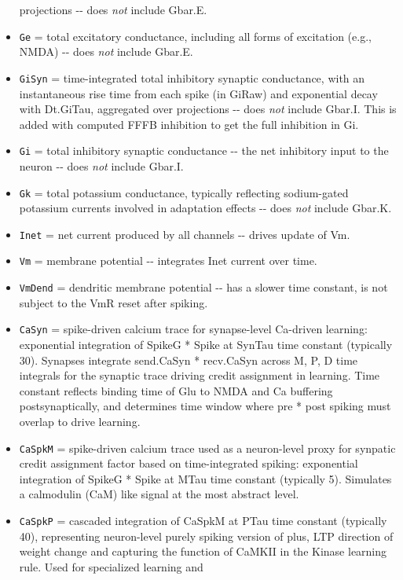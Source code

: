 \documentclass[11pt,twoside]{article}
\newif\myifpdf
\begin{document}
\begin{itemize}
  projections -\/- does \emph{not} include Gbar.E.
\item
  \texttt{Ge} = total excitatory conductance, including all forms of
  excitation (e.g., NMDA) -\/- does \emph{not} include Gbar.E.
\item
  \texttt{GiSyn} = time-integrated total inhibitory synaptic
  conductance, with an instantaneous rise time from each spike (in
  GiRaw) and exponential decay with Dt.GiTau, aggregated over
  projections -\/- does \emph{not} include Gbar.I. This is added with
  computed FFFB inhibition to get the full inhibition in Gi.
\item
  \texttt{Gi} = total inhibitory synaptic conductance -\/- the net
  inhibitory input to the neuron -\/- does \emph{not} include Gbar.I.
\item
  \texttt{Gk} = total potassium conductance, typically reflecting
  sodium-gated potassium currents involved in adaptation effects -\/-
  does \emph{not} include Gbar.K.
\item
  \texttt{Inet} = net current produced by all channels -\/- drives
  update of Vm.
\item
  \texttt{Vm} = membrane potential -\/- integrates Inet current over
  time.
\item
  \texttt{VmDend} = dendritic membrane potential -\/- has a slower time
  constant, is not subject to the VmR reset after spiking.
\item
  \texttt{CaSyn} = spike-driven calcium trace for synapse-level
  Ca-driven learning: exponential integration of SpikeG * Spike at
  SynTau time constant (typically 30). Synapses integrate send.CaSyn *
  recv.CaSyn across M, P, D time integrals for the synaptic trace
  driving credit assignment in learning. Time constant reflects binding
  time of Glu to NMDA and Ca buffering postsynaptically, and determines
  time window where pre * post spiking must overlap to drive learning.
\item
  \texttt{CaSpkM} = spike-driven calcium trace used as a neuron-level
  proxy for synpatic credit assignment factor based on time-integrated
  spiking: exponential integration of SpikeG * Spike at MTau time
  constant (typically 5). Simulates a calmodulin (CaM) like signal at
  the most abstract level.
\item
  \texttt{CaSpkP} = cascaded integration of CaSpkM at PTau time constant
  (typically 40), representing neuron-level purely spiking version of
  plus, LTP direction of weight change and capturing the function of
  CaMKII in the Kinase learning rule. Used for specialized learning and

\end{itemize}
\end{document}
